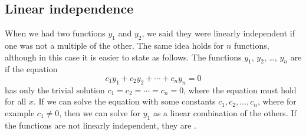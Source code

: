 \subsection{Linear independence}

When we had two functions $y_1$ and $y_2$, we said they were linearly
independent if one was not a multiple of the other.  The same idea holds for
$n$ functions, although in this case it is easier to state as follows. The functions
$y_1$, $y_2$, \ldots, $y_n$ are \emph{} if
the equation
\begin{equation*}
c_1 y_1 + c_2 y_2 + \cdots + c_n y_n = 0 
\end{equation*}
has only the trivial solution $c_1 = c_2 = \cdots = c_n = 0$, where the
equation must hold for all $x$.  If we can
solve the equation with some constants $c_1,c_2,\ldots,c_n$,
where for example $c_1 \neq 0$, then we
can solve for $y_1$ as a linear combination of the others.  If the functions
are not
linearly independent, they are \emph{}.

